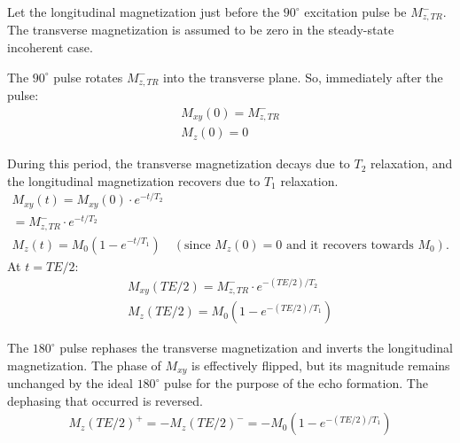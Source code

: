 \documentclass[10pt,a4paper,twoside]{article}
\begin{document}
\vspace{12pt}

Let the longitudinal magnetization just before the $90^\circ$ excitation pulse be $M_{z,TR}^-$. The transverse magnetization is assumed to be zero in the steady-state incoherent case.

\vspace{12pt}

The $90^\circ$ pulse rotates $M_{z,TR}^-$ into the transverse plane. So, immediately after the pulse:
\begin{gather*}
M_{xy}(0) = M_{z,TR}^- \\
M_z(0) = 0
\end{gather*}

\vspace{12pt}

During this period, the transverse magnetization decays due to $T_2$ relaxation, and the longitudinal magnetization recovers due to $T_1$ relaxation.
\begin{gather*}
M_{xy}(t) = M_{xy}(0) \cdot e^{-t/T_2} \\
= M_{z,TR}^- \cdot e^{-t/T_2} \\
M_z(t) = M_0(1 - e^{-t/T_1}) \quad (\text{since } M_z(0)=0 \text{ and it recovers towards } M_0).
\end{gather*}
At $t=TE/2$:
\begin{gather*}
M_{xy}(TE/2) = M_{z,TR}^- \cdot e^{-(TE/2)/T_2} \\
M_z(TE/2) = M_0(1 - e^{-(TE/2)/T_1})
\end{gather*}

\vspace{12pt}

The $180^\circ$ pulse rephases the transverse magnetization and inverts the longitudinal magnetization.
The phase of $M_{xy}$ is effectively flipped, but its magnitude remains unchanged by the ideal $180^\circ$ pulse for the purpose of the echo formation. The dephasing that occurred is reversed.
\begin{gather*}
M_z(TE/2)^+ = -M_z(TE/2)^- = -M_0(1 - e^{-(TE/2)/T_1})
\end{gather*}

\vspace{12pt}
\end{document}

